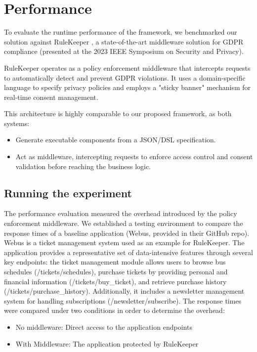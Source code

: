 \section{Performance}

To evaluate the runtime performance of the framework, we benchmarked our solution against RuleKeeper \cite{ferreira2023rulekeeper}, a state-of-the-art middleware solution for GDPR compliance (presented at the 2023 IEEE Symposium on Security and Privacy).

RuleKeeper operates as a policy enforcement middleware that intercepts requests to automatically detect and prevent GDPR violations. It uses a domain-specific language to specify privacy policies and employs a "sticky banner" mechanism for real-time consent management.

This architecture is highly comparable to our proposed framework, as both systems:

\begin{itemize}
    \item Generate executable components from a JSON/DSL specification.
    \item Act as middleware, intercepting requests to enforce access control and consent validation before reaching the business logic.
\end{itemize}

\subsection{Running the experiment}

The performance evaluation measured the overhead introduced by the policy enforcement middleware. We established a testing environment to compare the response times of a baseline application (Webus, provided in their GitHub repo). Webus is a ticket management system used as an example for RuleKeeper. The application provides a representative set of data-intensive features through several key endpoints: the ticket management module allows users to browse bus schedules (/tickets/schedules), purchase tickets by providing personal and financial information (/tickets/buy\_ticket), and retrieve purchase history (/tickets/purchase\_history). Additionally, it includes a newsletter management system for handling subscriptions (/newsletter/subscribe). The response times were compared under two conditions in order to determine the overhead:

\begin{itemize}
    \item No middleware: Direct access to the application endpoints
    \item With Middleware: The application protected by RuleKeeper
\end{itemize}


